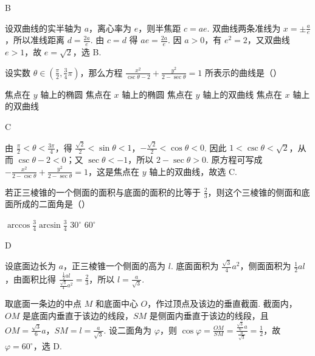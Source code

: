 \begin{answer}
B
\end{answer}

\begin{solution}
设双曲线的实半轴为 \(a\)，离心率为 \(e\)，则半焦距 \(c=ae\). 双曲线两条准线为 \(x=\pm\frac{a}{e}\)，所以准线距离
\(d=\frac{2a}{e}\). 由 \(c=d\) 得 \(ae=\frac{2a}{e}\). 因 \(a>0\)，有 \(e^{2}=2\)，又双曲线 \(e>1\)，故 \(e=\sqrt{2}\)，选 B.
\end{solution}

\begin{problem}

设实数 \(\theta \in \left(\frac{\pi}{2}, \frac{3}{4}\pi\right)\)，那么方程 \(\frac{x^2}{\csc \theta - 2} + \frac{y^2}{2 - \sec \theta} = 1 \) 所表示的曲线是（\quad）

\choices
{焦点在 \(y\) 轴上的椭圆}
{焦点在 \(x\) 轴上的椭圆}
{焦点在 \(y\) 轴上的双曲线}
{焦点在 \(x\) 轴上的双曲线}
\end{problem}

\begin{answer}
C
\end{answer}

\begin{solution}
由 \(\frac{\pi}{2}<\theta<\frac{3\pi}{4}\)，得
\(\frac{\sqrt{2}}{2}<\sin\theta<1\)，\(-\frac{\sqrt{2}}{2}<\cos\theta<0\). 因此
\(1<\csc\theta<\sqrt{2}\)，从而 \(\csc\theta-2<0\)；又 \(\sec\theta< -1\)，所以 \(2-\sec\theta>0\). 原方程可写成
\(-\frac{x^{2}}{2-\csc\theta}+\frac{y^{2}}{2-\sec\theta}=1\)，这是焦点在 \(y\) 轴上的双曲线，故选 C.
\end{solution}

\begin{problem}

若正三棱锥的一个侧面的面积与底面的面积的比等于 \(\frac{2}{3} \)，则这个三棱锥的侧面和底面所成的二面角是（\quad）

\choices
{\(\arccos\frac{3}{4} \)}{\(\arcsin\frac{3}
{4} \)}
{\(30^{\circ} \)}
{\(60^{\circ} \)}
\end{problem}

\begin{answer}
D
\end{answer}

\begin{solution}
设底面边长为 \(a\)，正三棱锥一个侧面的高为 \(l\). 底面面积为 \(\frac{\sqrt{3}}{4}a^{2}\)，侧面面积为 \(\frac{1}{2}al\)，由面积比得
\(\frac{\frac{1}{2}al}{\frac{\sqrt{3}}{4}a^{2}}=\frac{2}{3}\)，所以 \(l=\frac{a}{\sqrt{3}}\).

取底面一条边的中点 \(M\) 和底面中心 \(O\)，作过顶点及该边的垂直截面. 截面内，\(OM\) 是底面内垂直于该边的线段，\(SM\) 是侧面内垂直于该边的线段，且 \(OM=\frac{\sqrt{3}}{6}a\)，\(SM=l=\frac{a}{\sqrt{3}}\). 设二面角为 \(\varphi\)，则
\(\cos\varphi=\frac{OM}{SM}=\frac{\frac{\sqrt{3}}{6}a}{\frac{a}{\sqrt{3}}}=\frac{1}{2}\)，故 \(\varphi=60^\circ\)，选 D.
\end{solution}

